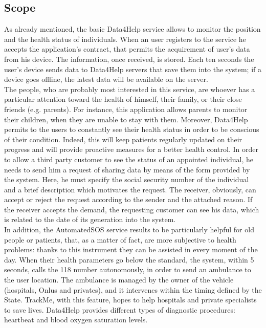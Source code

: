 \subsection{Scope}
As already mentioned, the basic Data4Help service allows to monitor the position and the health status of individuals. When an user registers to the service he accepts the application's contract, that permits the acquirement of user's data from his device. The information, once received, is stored. 
Each ten seconds the user's device sends data to Data4Help servers that save them into the system; if a device goes offline, the latest data will be available on the server.\\ 
The people, who are probably most interested in this service, are whoever has a particular attention toward the health of himself, their family, or their close friends (e.g. parents).
For instance, this application allows parents to monitor their children, when they are unable to stay with them. 
Moreover, Data4Help permits to the users to constantly see their health status in order to be conscious of their condition. Indeed, this will keep patients regularly updated on their progress and will provide proactive measures for a better health control. 
In order to allow a third party customer to see the status of an appointed individual, he needs to send him a request of sharing data by means of the form provided by the system. 
Here, he must specify the social security number of the individual and a brief description which motivates the request. 
The receiver, obviously, can accept or reject the request according to the sender and the attached reason. 
If the receiver accepts the demand, the requesting customer can see his data, which is related to the date of its generation into the system. \\ 
In addition, the AutomatedSOS service results to be particularly helpful for old people or patients, that, as a matter of fact, are more subjective to health problems: thanks to this instrument they can be assisted in every moment of the day. 
When their health parameters go below the standard, the system, within 5 seconds, calls the 118 number autonomously, in order to send an ambulance to the user location. 
The ambulance is managed by the owner of the vehicle (hospitals, Onlus and privates), and it intervenes within the timing defined by the State.
TrackMe, with this feature, hopes to help hospitals and private specialists to save lives.
Data4Help provides different types of diagnostic procedures:  heartbeat and blood oxygen saturation levels.\\ 
